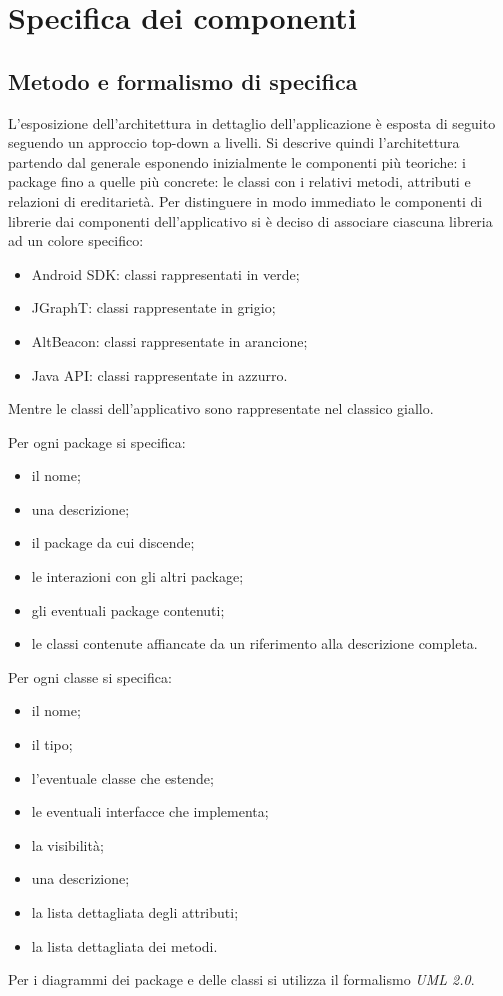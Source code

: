 \documentclass[../DefinizioneDiProdotto.tex]{subfiles}
\begin{document}
\section{Specifica dei componenti}

	\subsection{Metodo e formalismo di specifica}

		L'esposizione dell'architettura in dettaglio dell'applicazione è esposta di seguito seguendo un approccio top-down a livelli. Si descrive quindi l'architettura partendo dal generale esponendo inizialmente le componenti più teoriche: i package fino a quelle più concrete: le classi con i relativi metodi, attributi e relazioni di ereditarietà. 
		Per distinguere in modo immediato le componenti di librerie dai componenti dell'applicativo si è deciso di associare ciascuna libreria ad un colore specifico:
		\begin{itemize}
			\item Android SDK: classi rappresentati in verde;
			\item JGraphT: classi rappresentate in grigio;
			\item AltBeacon: classi rappresentate in arancione;
			\item Java API: classi rappresentate in azzurro.
		\end{itemize}
		Mentre le classi dell'applicativo sono rappresentate nel classico giallo.
		
		Per ogni package si specifica:
			\begin{itemize}
				\item il nome;
				\item una descrizione;
				\item il package da cui discende;
				\item le interazioni con gli altri package;
				\item gli eventuali package contenuti;
				\item le classi contenute affiancate da un riferimento alla descrizione completa.
			\end{itemize}
		Per ogni classe si specifica:
			\begin{itemize}
				\item il nome;
				\item il tipo;
				\item l'eventuale classe che estende;
				\item le eventuali interfacce che implementa;
				\item la visibilità;
				\item una descrizione;
				\item la lista dettagliata degli attributi;
				\item la lista dettagliata dei metodi.
			\end{itemize}
		Per i diagrammi dei package e delle classi si utilizza il formalismo \textit{UML 2.0}.
		
\end{document}
